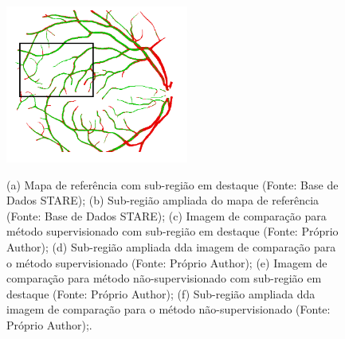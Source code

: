 \begin{figure}[!h]
        {\includegraphics[width=6cm]{Figuras/Cap4/Stare_Zana_Con_16}}
    \caption{(a) Mapa de refer\^{e}ncia com sub-regi\~{a}o em destaque (Fonte: Base de Dados STARE); (b) Sub-regi\~{a}o ampliada do mapa de refer\^{e}ncia (Fonte: Base de Dados STARE); (c) Imagem de compara\c{c}\~{a}o para m\'{e}todo supervisionado com sub-regi\~{a}o em destaque (Fonte: Pr\'{o}prio Author); (d) Sub-regi\~{a}o ampliada dda imagem de compara\c{c}\~{a}o para o m\'{e}todo supervisionado (Fonte: Pr\'{o}prio Author); (e) Imagem de compara\c{c}\~{a}o para m\'{e}todo n\~{a}o-supervisionado com sub-regi\~{a}o em destaque (Fonte: Pr\'{o}prio Author); (f) Sub-regi\~{a}o ampliada dda imagem de compara\c{c}\~{a}o para o m\'{e}todo n\~{a}o-supervisionado (Fonte: Pr\'{o}prio Author);.}
    \label{Fig:exemplesConStare}
\end{figure}

